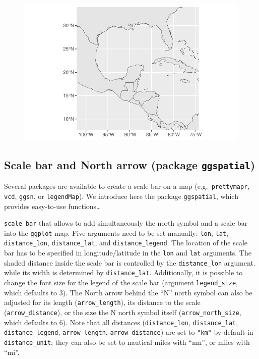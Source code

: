 \documentclass[
  letterpaper,
  DIV=11,
  numbers=noendperiod]{scrartcl}
\begin{document}
\begin{figure}[H]

{\centering \includegraphics{Introduction-to-mapping_files/figure-pdf/unnamed-chunk-12-1.pdf}

}

\end{figure}

\hypertarget{scale-bar-and-north-arrow-package-ggspatial}{%
\subsection{\texorpdfstring{Scale bar and North arrow (package
\texttt{ggspatial})}{Scale bar and North arrow (package ggspatial)}}\label{scale-bar-and-north-arrow-package-ggspatial}}

Several packages are available to create a scale bar on a map
(e.g.~\texttt{prettymapr}, \texttt{vcd}, \texttt{ggsn}, or
\texttt{legendMap}). We introduce here the package \texttt{ggspatial},
which provides easy-to-use functions\ldots{}

\texttt{scale\_bar} that allows to add simultaneously the north symbol
and a scale bar into the \texttt{ggplot} map. Five arguments need to be
set manually: \texttt{lon}, \texttt{lat}, \texttt{distance\_lon},
\texttt{distance\_lat}, and \texttt{distance\_legend}. The location of
the scale bar has to be specified in longitude/latitude in the
\texttt{lon} and \texttt{lat} arguments. The shaded distance inside the
scale bar is controlled by the \texttt{distance\_lon} argument. while
its width is determined by \texttt{distance\_lat}. Additionally, it is
possible to change the font size for the legend of the scale bar
(argument \texttt{legend\_size}, which defaults to 3). The North arrow
behind the ``N'' north symbol can also be adjusted for its length
(\texttt{arrow\_length}), its distance to the scale
(\texttt{arrow\_distance}), or the size the N north symbol itself
(\texttt{arrow\_north\_size}, which defaults to 6). Note that all
distances (\texttt{distance\_lon}, \texttt{distance\_lat},
\texttt{distance\_legend}, \texttt{arrow\_length},
\texttt{arrow\_distance}) are set to \texttt{"km"} by default in
\texttt{distance\_unit}; they can also be set to nautical miles with
``nm'', or miles with ``mi''.
\end{document}
